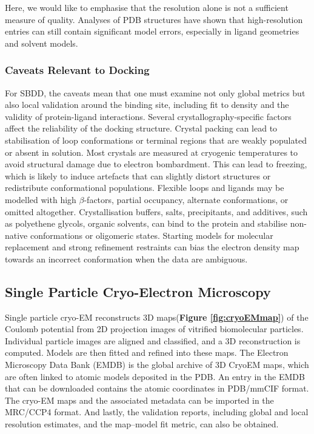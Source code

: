 \documentclass[12pt]{article}
\begin{document}
Here, we would like to emphasise that the resolution alone is not a sufficient measure of quality. Analyses of PDB structures have shown that high-resolution entries can still contain significant model errors, especially in ligand geometries and solvent models.\cite{CH4_shao2017multivariate,CH4_chakraborti2021all}

\subsubsection{Caveats Relevant to Docking}
For SBDD, the caveats mean that one must examine not only global metrics but also local validation around the binding site, including fit to density and the validity of protein-ligand interactions.
Several crystallography-specific factors affect the reliability of the docking structure. Crystal packing can lead to stabilisation of loop conformations or terminal regions that are weakly populated or absent in solution\cite{CH4_Joosten2009_PDB_related_databanks,CH4_Krissinel2007_PISA}.  Most crystals are measured at cryogenic temperatures to avoid structural damage due to electron bombardment.  This can lead to freezing, which is likely to induce artefacts that can slightly distort structures or redistribute conformational populations. Flexible loops and ligands may be modelled with high $\beta$-factors, partial occupancy, alternate conformations, or omitted altogether. Crystallisation buffers, salts, precipitants, and additives, such as polyethene glycols, organic solvents, can bind to the protein and stabilise non-native conformations or oligomeric states. Starting models for molecular replacement and strong refinement restraints can bias the electron density map towards an incorrect conformation when the data are ambiguous.\cite{CH4_karplus2012linking,CH4_Emsley2010_Coot}


\subsection{Single Particle Cryo-Electron Microscopy}

Single particle cryo-EM reconstructs 3D maps(\textbf{Figure \ref{fig:cryoEMmap}}) of the Coulomb potential from 2D projection images of vitrified biomolecular particles. Individual particle images are aligned and classified, and a 3D reconstruction is computed. Models are then fitted and refined into these maps. The Electron Microscopy Data Bank (EMDB)\cite{CH4_wwpdb2024emdb} is the global archive of 3D CryoEM maps, which are often linked to atomic models deposited in the PDB. An entry in the EMDB that can be downloaded contains the atomic coordinates in PDB/mmCIF format. The cryo-EM maps and the associated metadata can be imported in the MRC/CCP4 format. And lastly, the validation reports, including global and local resolution estimates, and the map--model fit metric, can also be obtained.\cite{CH4_pintilie2021validation,CH4_Iudin2016_EM_validation}
\end{document}
